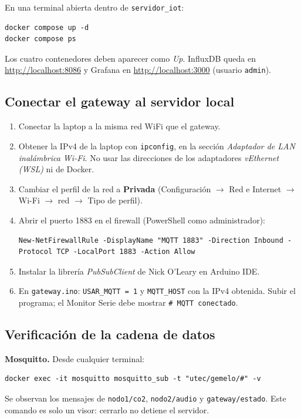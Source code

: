 \documentclass[11pt,a4paper]{article}
\newcommand{\arch}[1]{\texttt{#1}}
\begin{document}
En una terminal abierta dentro de \arch{servidor\_iot}:
\begin{lstlisting}[style=bash]
docker compose up -d
docker compose ps
\end{lstlisting}
Los cuatro contenedores deben aparecer como \emph{Up}. InfluxDB queda en
\url{http://localhost:8086} y Grafana en \url{http://localhost:3000} (usuario \texttt{admin}).

\subsection{Conectar el gateway al servidor local}

\begin{enumerate}
  \item Conectar la laptop a la misma red WiFi que el gateway.
  \item \label{paso:ip} Obtener la IPv4 de la laptop con \texttt{ipconfig}, en la secci\'on
        \emph{Adaptador de LAN inal\'ambrica Wi-Fi}. No usar las direcciones de los
        adaptadores \emph{vEthernet (WSL)} ni de Docker.
  \item Cambiar el perfil de la red a \textbf{Privada} (Configuraci\'on $\rightarrow$ Red e
        Internet $\rightarrow$ Wi-Fi $\rightarrow$ red $\rightarrow$ Tipo de perfil).
  \item Abrir el puerto 1883 en el firewall (PowerShell como administrador):
\begin{lstlisting}[style=bash]
New-NetFirewallRule -DisplayName "MQTT 1883" -Direction Inbound -Protocol TCP -LocalPort 1883 -Action Allow
\end{lstlisting}
  \item Instalar la librer\'ia \emph{PubSubClient} de Nick O'Leary en Arduino IDE.
  \item En \arch{gateway.ino}: \texttt{USAR\_MQTT = 1} y \texttt{MQTT\_HOST} con la IPv4
        obtenida. Subir el programa; el Monitor Serie debe mostrar \texttt{\# MQTT conectado}.
\end{enumerate}

\subsection{Verificaci\'on de la cadena de datos}

\textbf{Mosquitto.} Desde cualquier terminal:
\begin{lstlisting}[style=bash]
docker exec -it mosquitto mosquitto_sub -t "utec/gemelo/#" -v
\end{lstlisting}
Se observan los mensajes de \texttt{nodo1/co2}, \texttt{nodo2/audio} y
\texttt{gateway/estado}. Este comando es solo un visor: cerrarlo no detiene el servidor.
\end{document}
